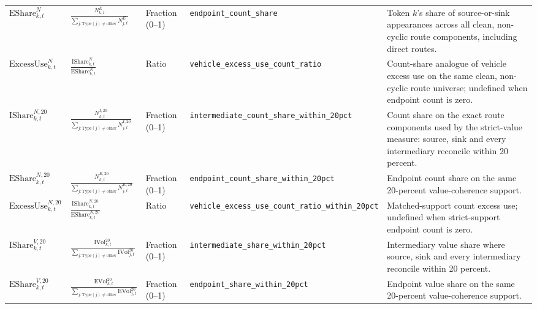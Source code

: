 \begin{tabularx}{\linewidth}{@{}>{\raggedright\arraybackslash}X>{\raggedright\arraybackslash}Xl>{\raggedright\arraybackslash}X>{\raggedright\arraybackslash}X@{}}
$\mathrm{EShare}^{N}_{k,t}$ & $\displaystyle\frac{N^{E}_{k,t}}{\sum_{j:\mathrm{Type}(j)\ne\mathrm{other}}N^{E}_{j,t}}$ & Fraction (0--1) & \texttt{endpoint\_\allowbreak{}count\_\allowbreak{}share} & Token $k$'s share of source-or-sink appearances across all clean, non-cyclic route components, including direct routes. \\
$\mathrm{ExcessUse}^{N}_{k,t}$ & $\displaystyle\frac{\mathrm{IShare}^{N}_{k,t}}{\mathrm{EShare}^{N}_{k,t}}$ & Ratio & \texttt{vehicle\_\allowbreak{}excess\_\allowbreak{}use\_\allowbreak{}count\_\allowbreak{}ratio} & Count-share analogue of vehicle excess use on the same clean, non-cyclic route universe; undefined when endpoint count is zero. \\
$\mathrm{IShare}^{N,20}_{k,t}$ & $\displaystyle\frac{N^{I,20}_{k,t}}{\sum_{j:\mathrm{Type}(j)\ne\mathrm{other}}N^{I,20}_{j,t}}$ & Fraction (0--1) & \texttt{intermediate\_\allowbreak{}count\_\allowbreak{}share\_\allowbreak{}within\_\allowbreak{}20pct} & Count share on the exact route components used by the strict-value measure: source, sink and every intermediary reconcile within 20 percent. \\
$\mathrm{EShare}^{N,20}_{k,t}$ & $\displaystyle\frac{N^{E,20}_{k,t}}{\sum_{j:\mathrm{Type}(j)\ne\mathrm{other}}N^{E,20}_{j,t}}$ & Fraction (0--1) & \texttt{endpoint\_\allowbreak{}count\_\allowbreak{}share\_\allowbreak{}within\_\allowbreak{}20pct} & Endpoint count share on the same 20-percent value-coherence support. \\
$\mathrm{ExcessUse}^{N,20}_{k,t}$ & $\displaystyle\frac{\mathrm{IShare}^{N,20}_{k,t}}{\mathrm{EShare}^{N,20}_{k,t}}$ & Ratio & \texttt{vehicle\_\allowbreak{}excess\_\allowbreak{}use\_\allowbreak{}count\_\allowbreak{}ratio\_\allowbreak{}within\_\allowbreak{}20pct} & Matched-support count excess use; undefined when strict-support endpoint count is zero. \\
$\mathrm{IShare}^{V,20}_{k,t}$ & $\displaystyle\frac{\mathrm{IVol}^{20}_{k,t}}{\sum_{j:\mathrm{Type}(j)\ne\mathrm{other}}\mathrm{IVol}^{20}_{j,t}}$ & Fraction (0--1) & \texttt{intermediate\_\allowbreak{}share\_\allowbreak{}within\_\allowbreak{}20pct} & Intermediary value share where source, sink and every intermediary reconcile within 20 percent. \\
$\mathrm{EShare}^{V,20}_{k,t}$ & $\displaystyle\frac{\mathrm{EVol}^{20}_{k,t}}{\sum_{j:\mathrm{Type}(j)\ne\mathrm{other}}\mathrm{EVol}^{20}_{j,t}}$ & Fraction (0--1) & \texttt{endpoint\_\allowbreak{}share\_\allowbreak{}within\_\allowbreak{}20pct} & Endpoint value share on the same 20-percent value-coherence support. \\

\end{tabularx}
